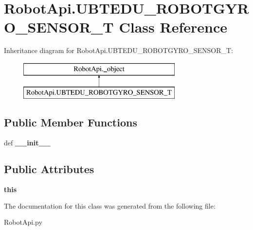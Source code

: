 \hypertarget{classRobotApi_1_1UBTEDU__ROBOTGYRO__SENSOR__T}{\section{Robot\+Api.\+U\+B\+T\+E\+D\+U\+\_\+\+R\+O\+B\+O\+T\+G\+Y\+R\+O\+\_\+\+S\+E\+N\+S\+O\+R\+\_\+\+T Class Reference}
\label{classRobotApi_1_1UBTEDU__ROBOTGYRO__SENSOR__T}
}
Inheritance diagram for Robot\+Api.\+U\+B\+T\+E\+D\+U\+\_\+\+R\+O\+B\+O\+T\+G\+Y\+R\+O\+\_\+\+S\+E\+N\+S\+O\+R\+\_\+\+T\+:\begin{figure}[H]
\begin{center}
\leavevmode
\includegraphics[height=2.000000cm]{classRobotApi_1_1UBTEDU__ROBOTGYRO__SENSOR__T}
\end{center}
\end{figure}
\subsection*{Public Member Functions}
\begin{DoxyCompactItemize}
\item 
\hypertarget{classRobotApi_1_1UBTEDU__ROBOTGYRO__SENSOR__T_a8e59f7437428060495a2c7dbe6eb6d01}{def {\bfseries \+\_\+\+\_\+init\+\_\+\+\_\+}}\label{classRobotApi_1_1UBTEDU__ROBOTGYRO__SENSOR__T_a8e59f7437428060495a2c7dbe6eb6d01}

\end{DoxyCompactItemize}
\subsection*{Public Attributes}
\begin{DoxyCompactItemize}
\item 
\hypertarget{classRobotApi_1_1UBTEDU__ROBOTGYRO__SENSOR__T_a1f5c9b1c0554aba851b7fc131eacbb25}{{\bfseries this}}\label{classRobotApi_1_1UBTEDU__ROBOTGYRO__SENSOR__T_a1f5c9b1c0554aba851b7fc131eacbb25}

\end{DoxyCompactItemize}


The documentation for this class was generated from the following file\+:\begin{DoxyCompactItemize}
\item 
Robot\+Api.\+py\end{DoxyCompactItemize}
